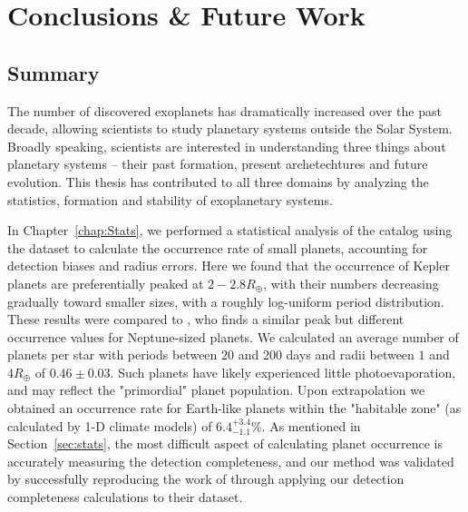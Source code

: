 \chapter{Conclusions \& Future Work}

\section{Summary}
The number of discovered exoplanets has dramatically increased over the past decade, allowing scientists to study planetary systems outside the Solar System. 
Broadly speaking, scientists are interested in understanding three things about planetary systems -- their past formation, present archetechtures and future evolution. 
This thesis has contributed to all three domains by analyzing the statistics, formation and stability of exoplanetary systems. 

In Chapter~\ref{chap:Stats}, we performed a statistical analysis of the \kep catalog using the \citet{Ramirez2014} dataset to calculate the occurrence rate of small planets, accounting for detection biases and radius errors. 
Here we found that the occurrence of Kepler planets are preferentially peaked at $2-2.8R_\oplus$, with their numbers decreasing gradually toward smaller sizes, with a roughly log-uniform period distribution.
These results were compared to \citet{Petigura2013}, who finds a similar peak but different occurrence values for Neptune-sized planets. 
We calculated an average number of planets per star with periods between $20$ and $200$ days and radii between $1$ and $4R_\oplus$ of $0.46 \pm 0.03$. 
Such planets have likely experienced little photoevaporation, and may reflect the "primordial" planet population. 
Upon extrapolation we obtained an occurrence rate for Earth-like planets within the "habitable zone" (as calculated by 1-D climate models) of $6.4^{+3.4}_{-1.1}\%$. 
As mentioned in Section~\ref{sec:stats}, the most difficult aspect of calculating planet occurrence is accurately measuring the detection completeness, and our method was validated by successfully reproducing the work of \citet{Petigura2013} through applying our detection completeness calculations to their dataset.

